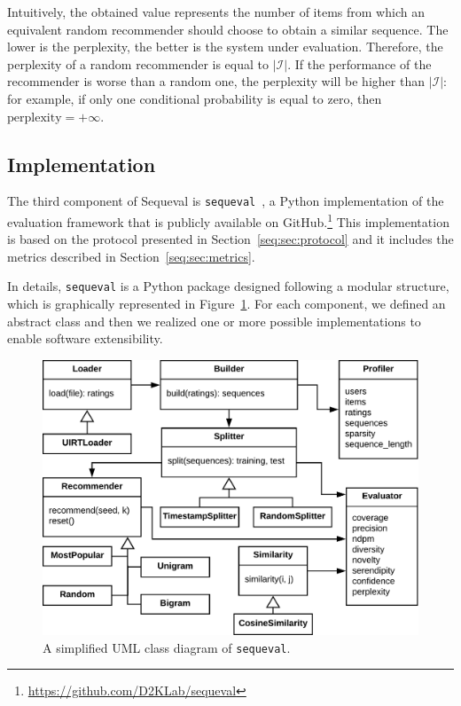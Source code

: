 Intuitively, the obtained value represents the number of items from which an equivalent random recommender should choose to obtain a similar sequence. The lower is the perplexity, the better is the system under evaluation. Therefore, the perplexity of a random recommender is equal to $|\mathcal{I}|$. If the performance of the recommender is worse than a random one, the perplexity will be higher than $|\mathcal{I}|$: for example, if only one conditional probability is equal to zero, then $\mathrm{perplexity} = +\infty$.

\subsection{Implementation}
\label{seq:sec:implementation}

The third component of Sequeval is \texttt{sequeval}~\cite{Sequeval2018}, a Python implementation of the evaluation framework that is publicly available on GitHub.\footnote{\url{https://github.com/D2KLab/sequeval}} This implementation is based on the protocol presented in Section~\ref{seq:sec:protocol} and it includes the metrics described in Section~\ref{seq:sec:metrics}.

In details, \texttt{sequeval} is a Python package designed following a modular structure, which is graphically represented in Figure~\ref{seq:fig:uml}. For each component, we defined an abstract class and then we realized one or more possible implementations to enable software extensibility.

\begin{figure}
\centering
\includegraphics[width=.9\linewidth]{uml}
\caption[UML class diagram of sequeval]{A simplified UML class diagram of \texttt{sequeval}.}
\label{seq:fig:uml}
\end{figure}


